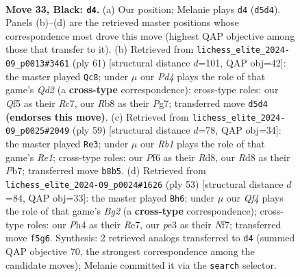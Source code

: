\documentclass[11pt]{article}
\begin{document}
\clearpage

\begin{figure}[p]\centering
\begin{subfigure}{0.46\textwidth}\centering
\resizebox{\linewidth}{!}{%
\newchessgame
\chessboard[
  setfen={1r1rnk2/p1p5/5p2/2Pp1q2/5P1p/1P2P3/1Q1BK1RP/5BR1 b - - 1 33},
  showmover=false,
  pgfstyle=straightmove, color=movearrow, markmove={d5-d4}
]}
\caption{}
\end{subfigure}\hfill
\begin{subfigure}{0.46\textwidth}\centering
\resizebox{\linewidth}{!}{%
\newchessgame
\chessboard[
  setfen={6k1/2rq2pp/b3p3/5p2/r1PPpP2/2R5/4QBPP/2R3K1 b - - 6 31},
  showmover=false,
  pgfstyle=straightmove, color=movearrow, markmove={d7-c8}
]}
\caption{}
\end{subfigure}
\\[4pt]
\begin{subfigure}{0.46\textwidth}\centering
\resizebox{\linewidth}{!}{%
\newchessgame
\chessboard[
  setfen={3rr3/1p3pk1/3q2p1/p2P2P1/5nQ1/1P3B2/P2R3P/3R2K1 b - - 3 30},
  showmover=false,
  pgfstyle=straightmove, color=movearrow, markmove={e8-e3}
]}
\caption{}
\end{subfigure}\hfill
\begin{subfigure}{0.46\textwidth}\centering
\resizebox{\linewidth}{!}{%
\newchessgame
\chessboard[
  setfen={1r4k1/q3rnbp/2Rp2p1/3P1p2/1p1P4/6P1/1P1Q1BBP/2R3K1 b - - 10 27},
  showmover=false,
  pgfstyle=straightmove, color=movearrow, markmove={g7-h6}
]}
\caption{}
\end{subfigure}
\caption{\textbf{Move 33, Black: \texttt{d4}.} (a) Our position; Melanie plays \texttt{d4} (\texttt{d5d4}). Panels (b)--(d) are the retrieved master positions whose correspondence most drove this move (highest QAP objective among those that transfer to it). (b) Retrieved from \texttt{lichess\_elite\_2024-09\_p0013\#3461} (ply 61) [structural distance $d$=101, QAP obj=42]: the master played \texttt{Qc8}; under $\mu$ our \emph{Pd4} plays the role of that game's \emph{Qd2} (a \textbf{cross-type} correspondence); cross-type roles: our \emph{Q}f5 as their \emph{R}c7, our \emph{R}b8 as their \emph{P}g7; transferred move \texttt{d5d4} \textbf{(endorses this move)}. (c) Retrieved from \texttt{lichess\_elite\_2024-09\_p0025\#2049} (ply 59) [structural distance $d$=78, QAP obj=34]: the master played \texttt{Re3}; under $\mu$ our \emph{Rb1} plays the role of that game's \emph{Re1}; cross-type roles: our \emph{P}f6 as their \emph{R}d8, our \emph{R}d8 as their \emph{P}b7; transferred move \texttt{b8b5}. (d) Retrieved from \texttt{lichess\_elite\_2024-09\_p0024\#1626} (ply 53) [structural distance $d$=84, QAP obj=33]: the master played \texttt{Bh6}; under $\mu$ our \emph{Qf4} plays the role of that game's \emph{Bg2} (a \textbf{cross-type} correspondence); cross-type roles: our \emph{P}h4 as their \emph{R}e7, our \emph{p}e3 as their \emph{N}f7; transferred move \texttt{f5g6}. Synthesis: 2 retrieved analogs transferred to \texttt{d4} (summed QAP objective 70, the strongest correspondence among the candidate moves); Melanie committed it via the \texttt{search} selector.}
\label{fig:thought-m65}
\end{figure}
\end{document}
